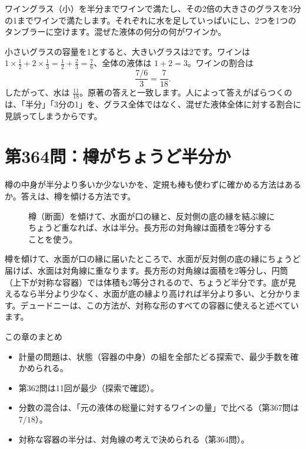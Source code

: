 \documentclass[a4paper,11pt,openany]{ltjsbook}
\begin{document}
ワイングラス（小）を半分までワインで満たし、その2倍の大きさのグラスを3分の1までワインで満たします。それぞれに水を足していっぱいにし、2つを1つのタンブラーに空けます。混ぜた液体の何分の何がワインか。

小さいグラスの容量を1とすると、大きいグラスは2です。ワインは $1\times\tfrac12+2\times\tfrac13=\tfrac12+\tfrac23=\tfrac76$、全体の液体は $1+2=3$。ワインの割合は
\[
\frac{7/6}{3}=\frac{7}{18}.
\]
したがって、水は $\tfrac{11}{18}$。原著の答えと一致します。人によって答えがばらつくのは、「半分」「3分の1」を、グラス全体ではなく、混ぜた液体全体に対する割合に見誤ってしまうからです。

\section{第364問：樽がちょうど半分か}

樽の中身が半分より多いか少ないかを、定規も棒も使わずに確かめる方法はあるか。答えは、樽を傾ける方法です。

\begin{figure}[htbp]
\centering
{}
\caption{樽（断面）を傾けて、水面が口の縁と、反対側の底の縁を結ぶ線にちょうど重なれば、水は半分。長方形の対角線は面積を2等分することを使う。}
\end{figure}

樽を傾けて、水面が口の縁に届いたところで、水面が反対側の底の縁にちょうど届けば、水面は対角線に重なります。長方形の対角線は面積を2等分し、円筒（上下が対称な容器）では体積も2等分されるので、ちょうど半分です。底が見えるなら半分より少なく、水面が底の縁より高ければ半分より多い、と分かります。デュードニーは、この方法が、対称な形のすべての容器に使えると述べています。

\begin{pointbox}{この章のまとめ}
\begin{itemize}[leftmargin=*]
\item 計量の問題は、状態（容器の中身）の組を全部たどる探索で、最少手数を確かめられる。
\item 第362問は11回が最少（探索で確認）。
\item 分数の混合は、「元の液体の総量に対するワインの量」で比べる（第367問は $7/18$）。
\item 対称な容器の半分は、対角線の考えで決められる（第364問）。
\end{itemize}
\end{pointbox}
\end{document}
